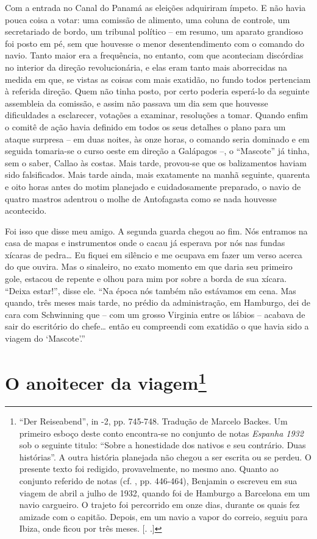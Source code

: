 Com a entrada no Canal do Panamá as eleições adquiriram ímpeto. E não
havia pouca coisa a votar: uma comissão de alimento, uma coluna de
controle, um secretariado de bordo, um tribunal político -- em resumo,
um aparato grandioso foi posto em pé, sem que houvesse o menor
desentendimento com o comando do navio. Tanto maior era a frequência, no
entanto, com que aconteciam discórdias no interior da direção
revolucionária, e elas eram tanto mais aborrecidas na medida em que, se
vistas as coisas com mais exatidão, no fundo todos pertenciam à referida
direção. Quem não tinha posto, por certo poderia esperá-lo da seguinte
assembleia da comissão, e assim não passava um dia sem que houvesse
dificuldades a esclarecer, votações a examinar, resoluções a tomar.
Quando enfim o comitê de ação havia definido em todos os seus detalhes o
plano para um ataque surpresa -- em duas noites, às onze horas, o
comando seria dominado e em seguida tomaria-se o curso oeste em direção a
Galápagos --, o ``Mascote'' já tinha, sem o saber, Callao às costas.
Mais tarde, provou-se que os balizamentos haviam sido falsificados. Mais tarde
ainda, mais exatamente na manhã seguinte, quarenta e oito horas antes do
motim planejado e cuidadosamente preparado, o navio de quatro mastros
adentrou o molhe de Antofagasta como se nada houvesse acontecido.

Foi isso que disse meu amigo. A segunda guarda chegou ao fim. Nós
entramos na casa de mapas e instrumentos onde o cacau já esperava por
nós nas fundas xícaras de pedra\ldots{} Eu fiquei em silêncio e me ocupava em
fazer um verso acerca do que ouvira. Mas o sinaleiro, no exato momento
em que daria seu primeiro gole, estacou de repente e olhou para mim por
sobre a borda de sua xícara. ``Deixa estar!'', disse ele. ``Na época nós
também não estávamos em cena. Mas quando, três meses mais tarde, no
prédio da administração, em Hamburgo, dei de cara com Schwinning que --
com um grosso Virginia entre os lábios -- acabava de sair do escritório
do chefe\ldots{} então eu compreendi com exatidão o que havia sido a viagem
do `Mascote'.''

\chapter{O anoitecer da viagem\footnote[*]{``Der Reiseabend'', in  -2, pp.
  745-748. Tradução de Marcelo Backes. Um primeiro esboço deste conto
  encontra-se no conjunto de notas \emph{Espanha 1932} sob o seguinte
  titulo: ``Sobre a honestidade dos nativos e seu contrário. Duas
  histórias''. A outra história planejada não chegou a ser escrita ou se
  perdeu. O presente texto foi redigido, provavelmente, no mesmo ano.
  Quanto ao conjunto referido de notas (cf.  , pp. 446-464),
  Benjamin o escreveu em sua viagem de abril a julho de 1932, quando foi
  de Hamburgo a Barcelona em um navio cargueiro. O trajeto foi percorrido em onze
  dias, durante os quais fez amizade com o capitão. Depois, em um navio a vapor do
  correio, seguiu para Ibiza, onde ficou por três meses. [. .]} }

